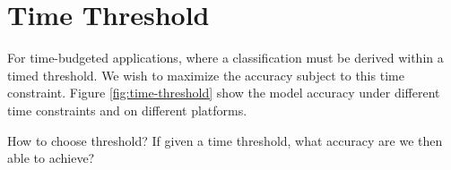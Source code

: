 \section{Time Threshold}

For time-budgeted applications, where a classification must be derived within a timed threshold. We wish to maximize the accuracy subject to this time constraint. Figure \ref{fig:time-threshold} show the model accuracy under different time constraints and on different platforms.

How to choose threshold?
If given a time threshold, what accuracy are we then able to achieve? 

\begin{figure}
	\captionsetup[subfigure]{justification=centering}
	\centering
	\hfill
	\hfill

\end{figure}

